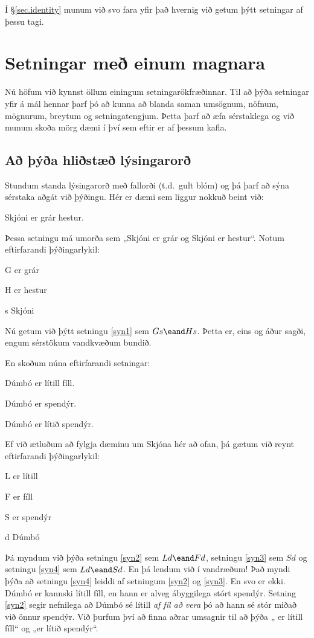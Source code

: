 Í \S \ref{sec.identity} munum við svo fara yfir það hvernig við getum þýtt setningar af þessu tagi.

\chapter{Setningar með einum magnara}\label{s:MoreMonadic}
Nú höfum við kynnst öllum einingum setningarökfræðinnar. Til að þýða setningar yfir á mál hennar þarf þó að kunna að blanda saman umsögnum, nöfnum, mögnurum, breytum og setningatengjum. Þetta þarf að æfa sérstaklega og við munum skoða mörg dæmi í því sem eftir er af þessum kafla.

\section{Að þýða hliðstæð lýsingarorð}

Stundum standa lýsingarorð með fallorði (t.d.\ gult blóm) og þá þarf að sýna sérstaka aðgát við þýðingu. Hér er dæmi sem liggur nokkuð beint við:
	\begin{earg}
		\item[\ex{syn1}] Skjóni er grár hestur.
	\end{earg}
Þessa setningu má umorða sem „Skjóni er grár og Skjóni er hestur“. Notum eftirfarandi þýðingarlykil:
	\begin{ekey}
		\item[G]  er grár
		\item[H]  er hestur
		\item[s] Skjóni
	\end{ekey}
Nú getum við þýtt setningu \ref{syn1} sem $Gs \eand Hs$. Þetta er, eins og áður sagði, engum sérstökum vandkvæðum bundið. 

En skoðum núna eftirfarandi setningar:
	\begin{earg}
		\item[\ex{syn2}] Dúmbó er lítill fíll. 
		\item[\ex{syn3}] Dúmbó er spendýr.
		\item[\ex{syn4}] Dúmbó er lítið spendýr.
	\end{earg}
Ef við ætluðum að fylgja dæminu um Skjóna hér að ofan, þá gætum við reynt eftirfarandi þýðingarlykil:	
	\begin{ekey}
		\item[L]  er lítill
		\item[F]  er fíll
		\item[S]  er spendýr
		\item[d] Dúmbó
	\end{ekey}
Þá myndum við þýða setningu \ref{syn2} sem $Ld \eand Fd$, setningu \ref{syn3} sem $Sd$ og setningu \ref{syn4} sem $Ld \eand Sd$. En þá lendum við í vandræðum! Það myndi þýða að setningu \ref{syn4} leiddi af setningum \ref{syn2} og \ref{syn3}. En svo er ekki. Dúmbó er kannski lítill fíll, en hann er alveg ábyggilega stórt spendýr. Setning \ref{syn2} segir nefnilega að Dúmbó sé lítill \emph{af fíl að vera} þó að hann sé stór miðað við önnur spendýr. Við þurfum því að finna aðrar umsagnir til að þýða „ \blank er lítill fíll“ og „\blank er lítið spendýr“.

